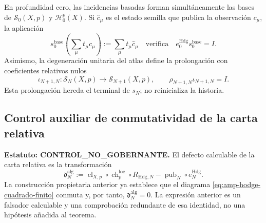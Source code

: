 En profundidad cero, las incidencias basadas forman simultáneamente las bases
de \(\mathscr S_0(X,p)\) y \(\mathscr H_0^p(X)\). Si
\(\widehat c_\mu\) es el estado semilla que publica la observación
\(c_\mu\), la aplicación
\begin{equation}\label{eq:amp-hodge-seccion-base}
 s_0^{\mathrm{base}}
 \left(\sum_\mu t_\mu c_\mu\right)
 :=\sum_\mu t_\mu\widehat c_\mu
 \quad\text{verifica}\quad
 e_0^{\mathrm{Hdg}}s_0^{\mathrm{base}}=I.
\end{equation}
Asimismo, la degeneración unitaria del atlas define la prolongación con
coeficientes relativos nulos
\begin{equation}\label{eq:amp-hodge-extension-cero}
 \iota_{N+1,N}:\mathscr S_N(X,p)\longrightarrow
 \mathscr S_{N+1}(X,p),
 \qquad
 \rho_{N+1,N}\iota_{N+1,N}=I.
\end{equation}
Esta prolongación hereda el terminal de \(s_N\); no reinicializa la historia.

\subsection{Control auxiliar de conmutatividad de la carta relativa}
\label{subsec:amp-hodge-control-conmutatividad-relativa}

\noindent\textbf{Estatuto: CONTROL\_NO\_GOBERNANTE.}
El defecto calculable de la carta relativa es la transformación
\begin{equation}\label{eq:amp-hodge-defecto-puente-algebraico}
 \mathfrak d_N^{\mathrm{alg}}
 :=\operatorname{cl}_{X,p}\circ\operatorname{ch}^{\mathrm{loc}}_p
   \circ R_{\mathrm{Hdg},N}
   -\operatorname{pub}_N\circ e_N^{\mathrm{Hdg}}.
\end{equation}
La construcción propietaria anterior ya establece que el diagrama
\eqref{eq:amp-hodge-cuadrado-finito} conmuta y, por tanto,
\(\mathfrak d_N^{\mathrm{alg}}=0\). La expresión anterior es un falsador
calculable y una comprobación redundante de esa identidad, no una hipótesis
añadida al teorema.

